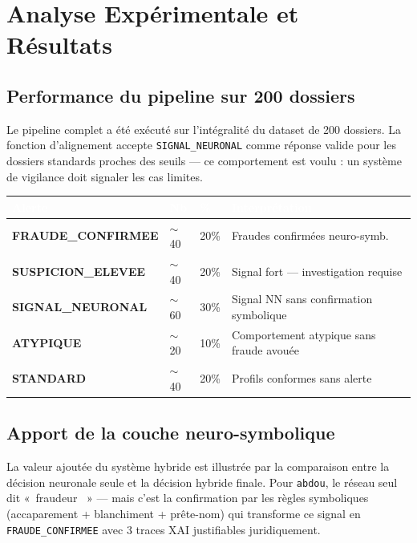 \documentclass[11pt,a4paper]{report}
\begin{document}
\chapter*{Analyse Expérimentale et Résultats}

\section{Performance du pipeline sur 200 dossiers}

Le pipeline complet a été exécuté sur l'intégralité du dataset de 200 dossiers.
La fonction d'alignement accepte \texttt{SIGNAL\_NEURONAL} comme réponse valide pour
les dossiers standards proches des seuils --- ce comportement est voulu : un système
de vigilance doit signaler les cas limites.

\begin{center}
\begin{tabular}{>{\bfseries}p{4cm} p{2cm} p{2cm} p{5.5cm}}
\toprule
\rowcolor{tablehead}\textcolor{white}{Alerte} & \textcolor{white}{Nb} & \textcolor{white}{\%} & \textcolor{white}{Interprétation} \\
\midrule
FRAUDE\_CONFIRMEE & $\sim$40 & 20\% & Fraudes confirmées neuro-symb. \\
SUSPICION\_ELEVEE & $\sim$40 & 20\% & Signal fort --- investigation requise \\
SIGNAL\_NEURONAL  & $\sim$60 & 30\% & Signal NN sans confirmation symbolique \\
ATYPIQUE          & $\sim$20 & 10\% & Comportement atypique sans fraude avouée \\
STANDARD          & $\sim$40 & 20\% & Profils conformes sans alerte \\
\bottomrule
\end{tabular}
\end{center}

\section{Apport de la couche neuro-symbolique}

La valeur ajoutée du système hybride est illustrée par la comparaison entre la
décision neuronale seule et la décision hybride finale. Pour \texttt{abdou}, le
réseau seul dit «~fraudeur ~» --- mais c'est la confirmation par les règles
symboliques (accaparement + blanchiment + prête-nom) qui transforme ce signal en
\texttt{FRAUDE\_CONFIRMEE} avec 3 traces XAI justifiables juridiquement.
\end{document}
